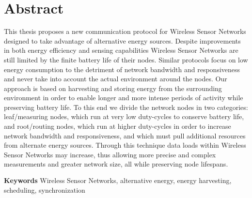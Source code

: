 
\chapter*{Abstract}

This thesis proposes a new communication protocol for Wireless Sensor Networks
designed to take advantage of alternative energy sources. Despite improvements
in both energy efficiency and sensing capabilities Wireless Sensor Networks are
still limited by the finite battery life of their nodes. Similar protocols
focus on low energy consumption to the detriment of network bandwidth and
responsiveness and never take into account the actual environment around the
nodes. Our approach is based on harvesting and storing energy from the
surrounding environment in order to enable longer and more intense periods of
activity while preserving battery life. To this end we divide the network
nodes in two categories: leaf/measuring nodes, which run at very low
duty-cycles to conserve battery life, and root/routing nodes, which run at
higher duty-cycles in order to increase network bandwidth and responsiveness,
and which must pull additional resources from alternate energy sources. Through this
technique data loads within Wireless Sensor Networks may increase, thus
allowing more precise and complex measurements and greater network size, all
while preserving node lifespans.

\vspace{\baselineskip}

\textbf{Keywords} Wireless Sensor Networks, alternative energy, energy
harvesting, scheduling, synchronization


